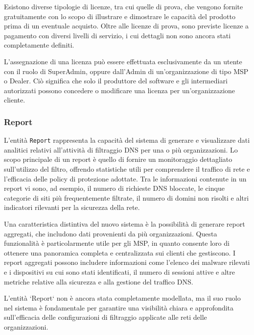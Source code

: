 Esistono diverse tipologie di licenze, tra cui quelle di prova, che vengono fornite gratuitamente con lo scopo di illustrare e dimostrare le capacità del prodotto prima di un eventuale acquisto. Oltre alle licenze di prova, sono previste licenze a pagamento con diversi livelli di servizio, i cui dettagli non sono ancora stati completamente definiti.

L'assegnazione di una licenza può essere effettuata esclusivamente da un utente con il ruolo di SuperAdmin, oppure dall’Admin di un’organizzazione di tipo MSP o Dealer. Ciò significa che solo il produttore del software e gli intermediari autorizzati possono concedere o modificare una licenza per un'organizzazione cliente.

\subsubsection{Report}
L'entità \texttt{Report} rappresenta la capacità del sistema di generare e visualizzare dati analitici relativi all'attività di filtraggio DNS per una o più organizzazioni. Lo scopo principale di un report è quello di fornire un monitoraggio dettagliato sull'utilizzo del filtro, offrendo statistiche utili per comprendere il traffico di rete e l'efficacia delle policy di protezione adottate. Tra le informazioni contenute in un report vi sono, ad esempio, il numero di richieste DNS bloccate, le cinque categorie di siti più frequentemente filtrate, il numero di domini non risolti e altri indicatori rilevanti per la sicurezza della rete.

Una caratteristica distintiva del nuovo sistema è la possibilità di generare report aggregati, che includono dati provenienti da più organizzazioni. Questa funzionalità è particolarmente utile per gli MSP, in quanto consente loro di ottenere una panoramica completa e centralizzata sui clienti che gestiscono. I report aggregati possono includere informazioni come l’elenco dei malware rilevati e i dispositivi su cui sono stati identificati, il numero di sessioni attive e altre metriche relative alla sicurezza e alla gestione del traffico DNS.

L'entità `Report` non è ancora stata completamente modellata, ma il suo ruolo nel sistema è fondamentale per garantire una visibilità chiara e approfondita sull’efficacia delle configurazioni di filtraggio applicate alle reti delle organizzazioni.
